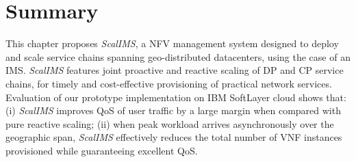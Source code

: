 \section{Summary}

This chapter proposes \textit{ScalIMS}, a NFV management system designed to deploy and scale service chains spanning geo-distributed datacenters, using the case of an IMS. \textit{ScalIMS} features joint proactive and reactive scaling of DP and CP service chains, for timely and cost-effective provisioning of practical network services. Evaluation of our prototype implementation on IBM SoftLayer cloud shows that: (i) \textit{ScalIMS} improves QoS of user traffic by a large margin when compared with pure reactive scaling; (ii) when peak workload arrives asynchronously over the geographic span, \textit{ScalIMS} effectively reduces the total number of VNF instances provisioned while guaranteeing excellent QoS. %

